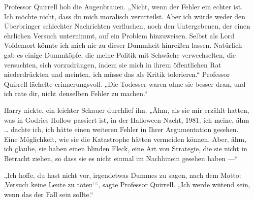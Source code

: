 Professor Quirrell hob die Augenbrauen.
„Nicht, wenn der Fehler ein echter ist. Ich möchte nicht, dass du mich moralisch verurteilst. Aber ich würde weder den Überbringer schlechter Nachrichten verfluchen, noch den Untergebenen, der einen ehrlichen Versuch unternimmt, auf ein Problem hinzuweisen. Selbst als Lord Voldemort könnte ich mich nie zu dieser Dummheit hinreißen lassen. Natürlich gab es einige Dummköpfe, die meine Politik mit Schwäche verwechselten, die versuchten, sich vorzudrängen, indem sie mich in ihrem öffentlichen Rat niederdrückten und meinten, ich müsse das als Kritik tolerieren.“
Professor Quirrell lächelte erinnerungsvoll.
„Die Todesser waren ohne sie besser dran, und ich rate dir, nicht denselben Fehler zu machen.“

Harry nickte, ein leichter Schauer durchlief ihn.
„Ähm, als sie mir erzählt hatten, was in Godrics Hollow passiert ist, in der Halloween-Nacht, 1981, ich meine, ähm … dachte ich, ich hätte einen weiteren Fehler in Ihrer Argumentation gesehen. Eine Möglichkeit, wie sie die Katastrophe hätten vermeiden können. Aber, ähm, ich glaube, sie haben einen blinden Fleck, eine Art von Strategie, die sie nicht in Betracht ziehen, so dass sie es nicht einmal im Nachhinein gesehen haben —“

„Ich hoffe, du hast nicht vor, irgendetwas Dummes zu sagen, nach dem Motto: ‚Versuch keine Leute zu töten‘“, sagte Professor Quirrell.
„Ich werde wütend sein, wenn das der Fall sein sollte.“

